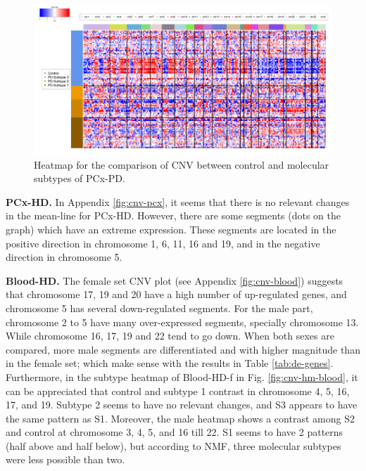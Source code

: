 \begin{figure}[!ht]
    \centerline{\includegraphics[width = 15cm]{Figures/CNV/cnv-pd.png}}
\caption{Heatmap for the comparison of CNV between control and molecular subtypes of PCx-PD.}
\label{fig:cnv-hm-pd}
\end{figure}

\textbf{PCx-HD.} In Appendix \ref{fig:cnv-pcx}, it seems that there is no relevant changes in the mean-line for PCx-HD. However, there are some segments (dots on the graph) which have an extreme expression. These segments are located in the positive direction in chromosome 1, 6, 11, 16 and 19, and in the negative direction in chromosome 5.

\textbf{Blood-HD.} The female set CNV plot (see Appendix \ref{fig:cnv-blood}) suggests that chromosome 17, 19 and 20 have a high number of up-regulated genes, and chromosome 5 has several down-regulated segments. For the male part, chromosome 2 to 5 have many over-expressed segments, specially chromosome 13. While chromosome 16, 17, 19 and 22 tend to go down. When both sexes are compared, more male segments are differentiated and with higher magnitude than in the female set; which make sense with the results in Table \ref{tab:de-genes}. Furthermore, in the subtype heatmap of Blood-HD-f in Fig. \ref{fig:cnv-hm-blood}, it can be appreciated that control and subtype 1 contrast in chromosome 4, 5, 16, 17, and 19. Subtype 2 seems to have no relevant changes, and S3 appears to have the same pattern as S1. Moreover, the male heatmap shows a contrast among S2 and control at chromosome 3, 4, 5, and 16 till 22. S1 seems to have 2 patterns (half above and half below), but according to NMF, three molecular subtypes were less possible than two.

